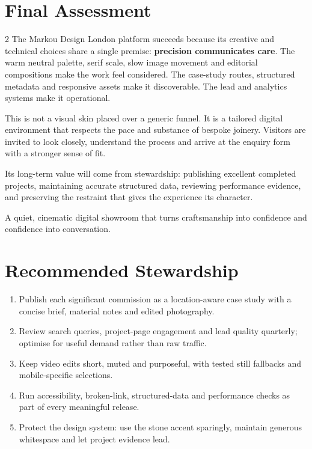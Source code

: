 \documentclass[10.5pt,a4paper]{article}
\newcommand{\eyebrow}[1]{%
  {\fontsize{7.8}{10}\selectfont\bfseries\color{MarkouStone}\textls[180]{\MakeUppercase{#1}}}%
}
\begin{document}
\section{Final Assessment}
\begin{multicols}{2}
\small
The Markou Design London platform succeeds because its creative and technical
choices share a single premise: \textbf{precision communicates care}. The warm
neutral palette, serif scale, slow image movement and editorial compositions
make the work feel considered. The case-study routes, structured metadata and
responsive assets make it discoverable. The lead and analytics systems make it
operational.

This is not a visual skin placed over a generic funnel. It is a tailored digital
environment that respects the pace and substance of bespoke joinery. Visitors
are invited to look closely, understand the process and arrive at the enquiry
form with a stronger sense of fit.

Its long-term value will come from stewardship: publishing excellent completed
projects, maintaining accurate structured data, reviewing performance evidence,
and preserving the restraint that gives the experience its character.
\end{multicols}

\vspace{5mm}
\begin{darkbox}
\eyebrow{The platform in one line}\par\vspace{4mm}
{\DisplayFont\fontsize{25}{29}\selectfont
A quiet, cinematic digital showroom that turns craftsmanship into confidence
and confidence into conversation.}
\end{darkbox}

\section{Recommended Stewardship}
\begin{enumerate}
  \item Publish each significant commission as a location-aware case study with
  a concise brief, material notes and edited photography.
  \item Review search queries, project-page engagement and lead quality
  quarterly; optimise for useful demand rather than raw traffic.
  \item Keep video edits short, muted and purposeful, with tested still
  fallbacks and mobile-specific selections.
  \item Run accessibility, broken-link, structured-data and performance checks
  as part of every meaningful release.
  \item Protect the design system: use the stone accent sparingly, maintain
  generous whitespace and let project evidence lead.
\end{enumerate}
\end{document}
